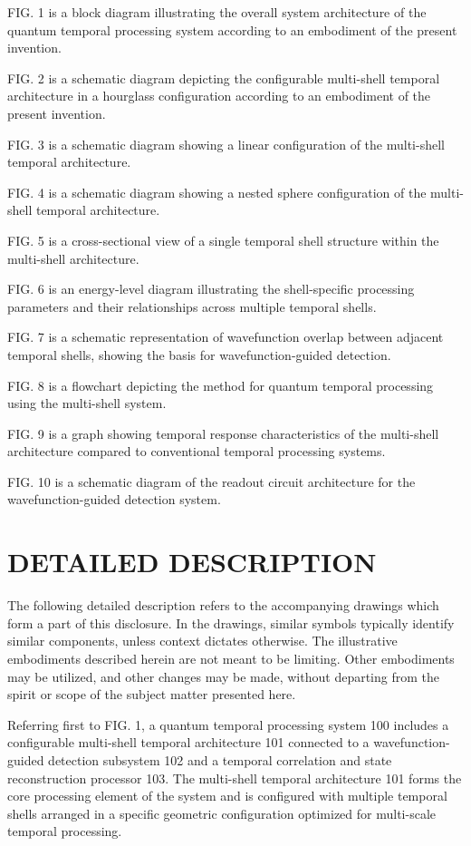 \documentclass[12pt,letterpaper]{article}
\begin{document}
FIG. 1 is a block diagram illustrating the overall system architecture of the quantum temporal processing system according to an embodiment of the present invention.

FIG. 2 is a schematic diagram depicting the configurable multi-shell temporal architecture in a hourglass configuration according to an embodiment of the present invention.

FIG. 3 is a schematic diagram showing a linear configuration of the multi-shell temporal architecture.

FIG. 4 is a schematic diagram showing a nested sphere configuration of the multi-shell temporal architecture.

FIG. 5 is a cross-sectional view of a single temporal shell structure within the multi-shell architecture.

FIG. 6 is an energy-level diagram illustrating the shell-specific processing parameters and their relationships across multiple temporal shells.

FIG. 7 is a schematic representation of wavefunction overlap between adjacent temporal shells, showing the basis for wavefunction-guided detection.

FIG. 8 is a flowchart depicting the method for quantum temporal processing using the multi-shell system.

FIG. 9 is a graph showing temporal response characteristics of the multi-shell architecture compared to conventional temporal processing systems.

FIG. 10 is a schematic diagram of the readout circuit architecture for the wavefunction-guided detection system.

\section*{DETAILED DESCRIPTION}

The following detailed description refers to the accompanying drawings which form a part of this disclosure. In the drawings, similar symbols typically identify similar components, unless context dictates otherwise. The illustrative embodiments described herein are not meant to be limiting. Other embodiments may be utilized, and other changes may be made, without departing from the spirit or scope of the subject matter presented here.

Referring first to FIG. 1, a quantum temporal processing system 100 includes a configurable multi-shell temporal architecture 101 connected to a wavefunction-guided detection subsystem 102 and a temporal correlation and state reconstruction processor 103. The multi-shell temporal architecture 101 forms the core processing element of the system and is configured with multiple temporal shells arranged in a specific geometric configuration optimized for multi-scale temporal processing.
\end{document}
